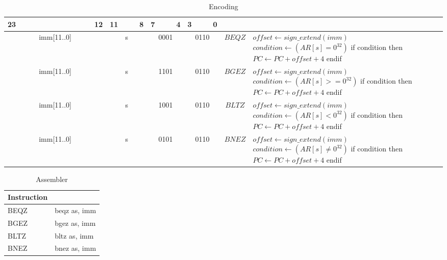 	\begin{longtable}{llllllllllllllllllllllll  p{1cm}  p{7cm} | }
		\caption{Encoding\label{long}}\\
		23 & & & & & & & & & & & 12 & 11 & & & 8 & 7 & & & 4 & 3 & & & 0 & &
		\multicolumn{1}{c}{}\\
		\hline
		\multicolumn{12}{|c|}{imm[11..0]} & \multicolumn{4}{c|}{s} & \multicolumn{4}{c|}{0001} & \multicolumn{4}{c|}{0110} & \multicolumn{1}{c|}{$BEQZ$} & $offset \leftarrow sign\_extend(imm)$ \newline $condition \leftarrow (AR[s] = 0^{32})$ \newline if condition then \newline $PC \leftarrow PC + offset + 4$ \newline endif\\ \hline
		\multicolumn{12}{|c|}{imm[11..0]} & \multicolumn{4}{c|}{s} & \multicolumn{4}{c|}{1101} & \multicolumn{4}{c|}{0110} & \multicolumn{1}{c|}{$BGEZ$} & $offset \leftarrow sign\_extend(imm)$ \newline $condition \leftarrow (AR[s] >= 0^{32})$ \newline if condition then \newline $PC \leftarrow PC + offset + 4$ \newline endif\\ \hline
		\multicolumn{12}{|c|}{imm[11..0]} & \multicolumn{4}{c|}{s} & \multicolumn{4}{c|}{1001} & \multicolumn{4}{c|}{0110} & \multicolumn{1}{c|}{$BLTZ$} & $offset \leftarrow sign\_extend(imm)$ \newline $condition \leftarrow (AR[s] < 0^{32})$ \newline if condition then \newline $PC \leftarrow PC + offset + 4$ \newline endif\\ \hline
		\multicolumn{12}{|c|}{imm[11..0]} & \multicolumn{4}{c|}{s} & \multicolumn{4}{c|}{0101} & \multicolumn{4}{c|}{0110} & \multicolumn{1}{c|}{$BNEZ$} & $offset \leftarrow sign\_extend(imm)$ \newline $condition \leftarrow (AR[s] \neq 0^{32})$ \newline if condition then \newline $PC \leftarrow PC + offset + 4$ \newline endif\\ \hline
	\end{longtable}

	\begin{longtable}{|p{5cm}|p{5cm}|}
		\caption{Assembler\label{long}}\\		
		\hline
		Instruction & \\
		\hline
		BEQZ & beqz as, imm\\ \hline
		BGEZ & bgez as, imm\\ \hline
		BLTZ & bltz as, imm\\ \hline
		BNEZ & bnez as, imm\\ \hline
	\end{longtable}
